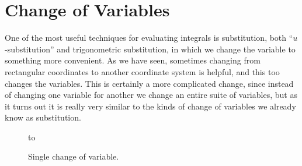 \section{Change of Variables}\label{sec:ChangeofVariables}

One of the most useful techniques for evaluating integrals is
substitution, both ``$u$-substitu\-tion'' and trigonometric
substitution, in which we change the variable to something more
convenient. As we have seen, sometimes changing from rectangular
coordinates to another coordinate system is helpful, and this too
changes the variables. This is certainly a more complicated change,
since instead of changing one variable for another we change an entire
suite of variables, but as it turns out it is really very similar to
the kinds of change of variables we already know as substitution.

\begin{figure}[H]
\hbox to 
\caption{Single change of variable.}
\label{fig:onechangeofvariable}
\end{figure}

